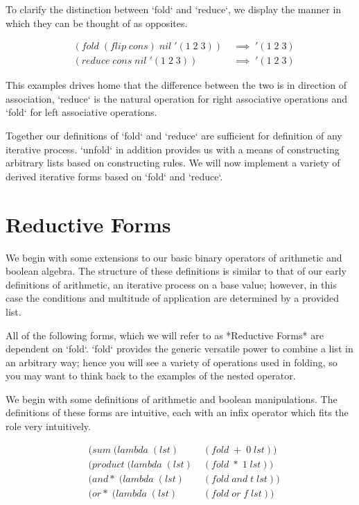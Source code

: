 To clarify the distinction between `fold` and `reduce`, we display the manner in 
which they can be thought of as opposites.

\begin{align*}
& (fold \; (flip \; cons) \; nil \; '(1 \; 2 \; 3)) \; &\implies \; '(1 \; 2 \; 3)
\\& (reduce \; cons \; nil \; '(1 \; 2 \; 3)) \; &\implies \; '(1 \; 2 \; 3)
\end{align*}

This examples drives home that the difference between the two is in direction of 
association, `reduce` is the natural operation for right associative operations 
and `fold` for left associative operations.

Together our definitions of `fold` and `reduce` are sufficient for definition of 
any iterative process. `unfold` in addition provides us with a means of 
constructing arbitrary lists based on constructing rules. We will now implement a 
variety of derived iterative forms based on `fold` and `reduce`.

\section{Reductive Forms}
We begin with some extensions to our basic binary operators of arithmetic and 
boolean algebra. The structure of these definitions is similar to that of our 
early definitions of arithmetic, an iterative process on a base value; however, in 
this case the conditions and multitude of application are determined by a provided 
list.

All of the following forms, which we will refer to as *Reductive Forms* are 
dependent on `fold`. `fold` provides the generic versatile power to combine a list 
in an arbitrary way; hence you will see a variety of operations used in folding, 
so you may want to think back to the examples of the nested operator.

We begin with some definitions of arithmetic and boolean manipulations. The 
definitions of these forms are intuitive, each with an infix operator which fits 
the role very intuitively.

\begin{align*}
& (sum \; (lambda \; (lst) \; &(fold \; + \; 0 \; lst))
\\& (product \; (lambda \; (lst) \; &(fold \; * \; 1 \; lst))
\\& (and* \; (lambda \; (lst) \; &(fold \; and \; t \; lst))
\\& (or* \; (lambda \; (lst) \; &(fold \; or \; f \; lst))
\end{align*}


